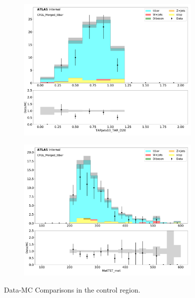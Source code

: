 \begin{figure}[htbp]
\begin{subfigure}{0.49\textwidth}
     \includegraphics[width = 0.98\textwidth]{Figures/4/datamc/CR1L_Merged_ttbar/TARJets10_TAR_D20.pdf}
     \caption{\DtwoTAR}
     \end{subfigure}
     \begin{subfigure}{0.49\textwidth}
     \includegraphics[width = 0.98\textwidth]{Figures/4/datamc/CR1L_Merged_ttbar/MetTST_met.pdf}
     \caption{\met}
     \end{subfigure}

     \caption{Data-MC Comparisons in the \merged \ttbar control region.}
     \label{fig:Data_MC_CRbV_merged}
  \end{figure}

